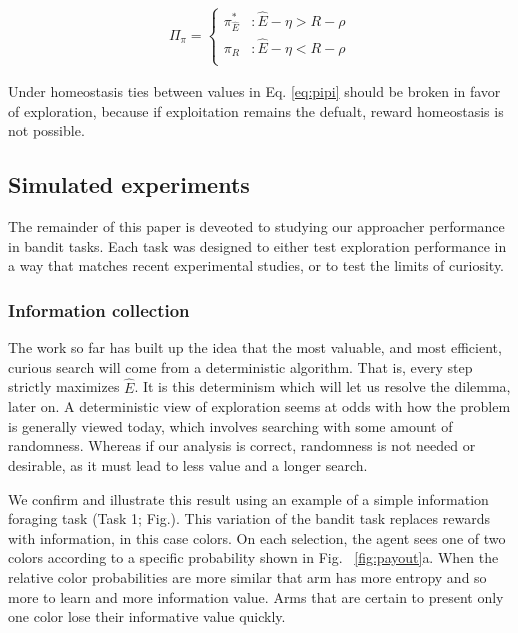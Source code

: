 \begin{equation} 
    \label{eq:pipi_h}
    \begin{split}
        \Pi_{\pi} = 
        \begin{cases}
            \pi^*_{\hat{E}} & : \hat{E} - \eta > R - \rho \\
            \pi_R 	& : \hat{E} - \eta < R - \rho \\
        \end{cases}
    \end{split}
\end{equation}

Under homeostasis ties between values in Eq. \ref{eq:pipi} should be broken in favor of exploration, because if exploitation remains the defualt, reward homeostasis is not possible. 

\subsection*{Simulated experiments}
The remainder of this paper is deveoted to studying our approacher performance in bandit tasks. Each task was designed to either test exploration performance in a way that matches recent experimental studies, or to test the limits of curiosity. 

\subsubsection*{Information collection}
The work so far has built up the idea that the most valuable, and most efficient, curious search will come from a deterministic algorithm. That is, every step strictly maximizes $\hat E$. It is this determinism which will let us resolve the dilemma, later on. A deterministic view of exploration seems at odds with how the problem is generally viewed today, which involves searching with some amount of randomness. Whereas if our analysis is correct, randomness is not needed or desirable, as it must lead to less value and a longer search. 

We confirm and illustrate this result using an example of a simple information foraging task (Task 1; Fig.\label{fig:task_outline1}). This variation of the bandit task \citep{Sutton2018} replaces rewards with information, in this case colors. On each selection, the agent sees one of two colors according to a specific probability shown in Fig. ~\ref{fig:payout}a. When the relative color probabilities are more similar that arm has more entropy and so more to learn and more information value. Arms that are certain to present only one color lose their informative value quickly.

